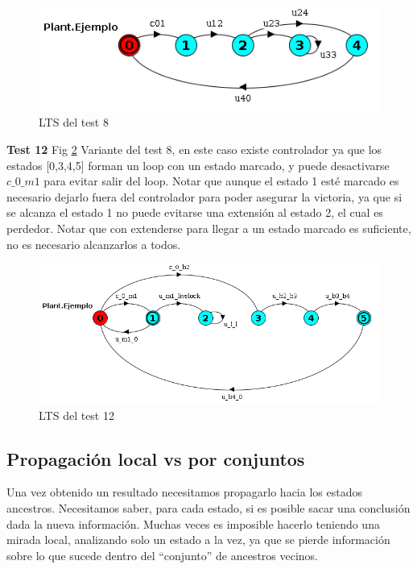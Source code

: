 \begin{figure}[h]
 \centering
 \includegraphics[scale=0.7]{figures/tests/test8.png}
 \caption{LTS del test 8}
 \label{fig:test8}
\end{figure}

\FloatBarrier
\textbf{Test 12} Fig \ref{fig:test12}
Variante del test 8, en este caso existe controlador ya que los estados [0,3,4,5] forman un loop con un estado marcado, y puede desactivarse $c\_0\_m1$ para evitar salir del loop. Notar que aunque el estado 1 esté marcado es necesario dejarlo fuera del controlador para poder asegurar la victoria, ya que si se alcanza el estado 1 no puede evitarse una extensión al estado 2, el cual es perdedor. Notar que con extenderse para llegar a un estado marcado es suficiente, no es necesario alcanzarlos a todos.
\begin{figure}[h]
 \centering
 \includegraphics[scale=0.6]{figures/tests/test12.png}
 \caption{LTS del test 12}
 \label{fig:test12}
\end{figure}

\FloatBarrier
\subsection{Propagación local vs por conjuntos}\label{propagacionLocal}

Una vez obtenido un resultado necesitamos propagarlo hacia los estados ancestros. Necesitamos saber, para cada estado, si es posible sacar una conclusión dada la nueva información. Muchas veces es imposible hacerlo teniendo una mirada local, analizando solo un estado a la vez, ya que se pierde información sobre lo que sucede dentro del ``conjunto'' de ancestros vecinos.

